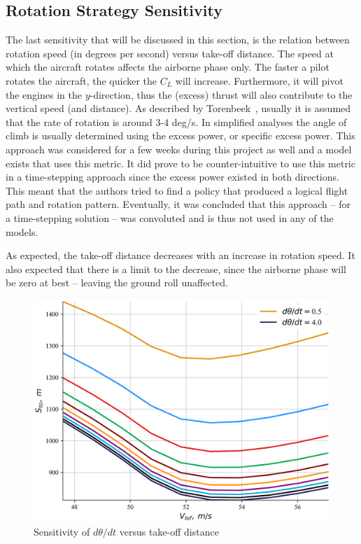 \subsection{Rotation Strategy Sensitivity}\label{sec:sensitivity_rotation}
The last sensitivity that will be discussed in this section, is the relation between rotation speed (in degrees per second) versus take-off distance. The speed at which the aircraft rotates affects the airborne phase only. The faster a pilot rotates the aircraft, the quicker the $C_L$ will increase. Furthermore, it will pivot the engines in the $y$-direction, thus the (excess) thrust will also contribute to the vertical speed (and distance). As described by Torenbeek~\cite{torenbeek2013synthesis}, usually it is assumed that the rate of rotation is around 3-4 deg/s. In simplified analyses the angle of climb is usually determined using the excess power, or specific excess power. This approach was considered for a few weeks during this project as well and a model exists that uses this metric. It did prove to be counter-intuitive to use this metric in a time-stepping approach since the excess power existed in both directions. This meant that the authors tried to find a policy that produced a logical flight path and rotation pattern. Eventually, it was concluded that this approach -- for a time-stepping solution -- was convoluted and is thus not used in any of the models.

As expected, the take-off distance decreases with an increase in rotation speed. It also expected that there is a limit to the decrease, since the airborne phase will be zero at best -- leaving the ground roll unaffected.

\begin{figure}[!ht]
    \centering
    \includegraphics[width=0.5\linewidth]{figures/Dash8-300_takeoff_level2b_sensitivity.png}
    \caption{Sensitivity of $d\theta/dt$ versus take-off distance}
    \label{fig:sensitivity_dthetadt_distance}
\end{figure}

